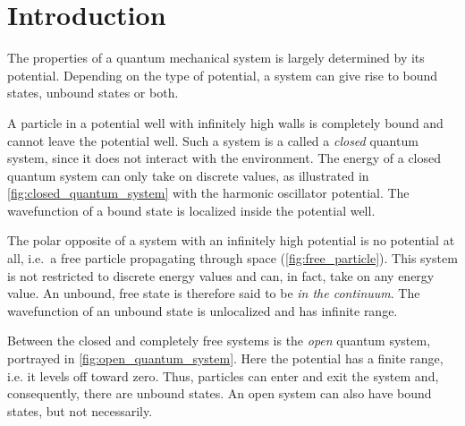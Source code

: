 \documentclass[../main/report.tex]{subfiles}
\begin{document}
\chapter{Introduction}

% 

The properties of a quantum mechanical system is largely determined by its potential. 
Depending on the type of potential, a system can give rise to bound states, unbound states or both.

A particle in a potential well with infinitely high walls is completely bound and cannot leave the potential well.
Such a system is a called a \emph{closed} quantum system, since it does not interact with the environment. 
The energy of a closed quantum system can only take on discrete values, as illustrated in \cref{fig:closed_quantum_system} with the harmonic oscillator potential.
The wavefunction of a bound state is localized inside the potential well.


The polar opposite of a system with an infinitely high potential is no potential at all, i.e.~a free particle propagating through space (\cref{fig:free_particle}).
This system is not restricted to discrete energy values and can, in fact, take on any energy value.
An unbound, free state is therefore said to be \emph{in the continuum}.
The wavefunction of an unbound state is unlocalized and has infinite range.

Between the closed and completely free systems is the \emph{open} quantum system, portrayed in \cref{fig:open_quantum_system}. 
Here the potential has a finite range, i.e. it levels off toward zero.
Thus, particles can enter and exit the system and, consequently, there are unbound states. 
An open system can also have bound states, but not necessarily.
\end{document}
